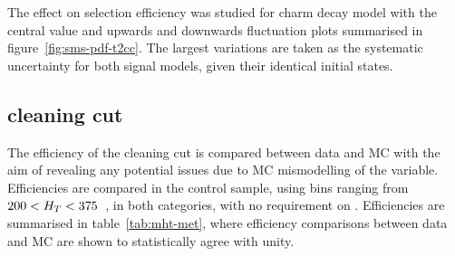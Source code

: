 The effect on selection efficiency was studied for charm decay model with the
central value and upwards and downwards fluctuation plots summarised in
figure~\ref{fig:sms-pdf-t2cc}. The largest variations are taken as the
systematic uncertainty for both signal models, given their identical initial
states.

\subsection{\mhtmet cleaning cut}
\label{sec:mhtmet_syst}
The efficiency of the \mhtmet cleaning cut is compared between data and MC with 
the aim of revealing any potential issues due to MC mismodelling of the 
variable. Efficiencies are compared in the \mj control sample, using \HT bins 
ranging from $200 < H_T < 375$~\gev, in both \nj categories, with no requirement
on \nb. Efficiencies are summarised in table~\ref{tab:mht-met}, where 
efficiency comparisons between data and MC are shown to statistically agree
with unity.


